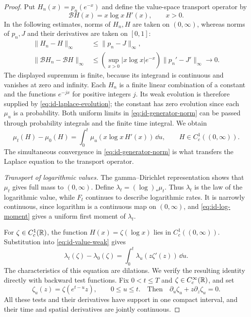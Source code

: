 \begin{proof}
Put $H_n(x)=p_n(e^{-x})$ and define the value-space transport operator by
\[
 \mathscr{B}H(x)=x\log x\,H'(x),\qquad x>0.
\]
In the following estimates, norms of $H_n,H$ are taken on $(0,\infty)$, whereas norms of $p_n,J$ and their derivatives are taken on $[0,1]$:
\begin{equation}
 \begin{aligned}
 \|H_n-H\|_\infty&\le\|p_n-J\|_\infty,\\
 \|\mathscr{B}H_n-\mathscr{B}H\|_\infty
 &\le\left(\sup_{x>0}|x\log x|e^{-x}\right)
                   \|p_n'-J'\|_\infty\longrightarrow0.
 \end{aligned}
 \label{eq:id-generator-norm}
\end{equation}
The displayed supremum is finite, because its integrand is continuous and vanishes at zero and infinity.
Each $H_n$ is a finite linear combination of a constant and the functions $e^{-jx}$ for positive integers $j$.
Its weak evolution is therefore supplied by \eqref{eq:id-laplace-evolution}; the constant has zero evolution since each $\mu_u$ is a probability.
Both uniform limits in \eqref{eq:id-generator-norm} can be passed through probability integrals and the finite time integral.
We obtain
\begin{equation}
 \mu_t(H)-\mu_0(H)
 =\int_0^t\mu_u(x\log x\,H'(x))\,\dd u,
 \qquad H\in C_c^1((0,\infty)).
 \label{eq:id-value-weak}
\end{equation}
The simultaneous convergence in \eqref{eq:id-generator-norm} is what transfers the Laplace equation to the transport operator.

\medskip\noindent\emph{Transport of logarithmic values.}
The gamma--Dirichlet representation shows that $\mu_t$ gives full mass to $(0,\infty)$.
Define $\lambda_t=(\log)_*\mu_t$.
Thus $\lambda_t$ is the law of the logarithmic value, while $F_t$ continues to describe logarithmic rates.
It is narrowly continuous, since logarithm is a continuous map on $(0,\infty)$, and \eqref{eq:id-log-moment} gives a uniform first moment of $\lambda_t$.

For $\zeta\in C_c^1(\mathbb R)$, the function $H(x)=\zeta(\log x)$ lies in $C_c^1((0,\infty))$.
Substitution into \eqref{eq:id-value-weak} gives
\begin{equation}
 \lambda_t(\zeta)-\lambda_0(\zeta)
 =\int_0^t\lambda_u(z\zeta'(z))\,\dd u.
 \label{eq:id-log-transport}
\end{equation}
The characteristics of this equation are dilations.
We verify the resulting identity directly with backward test functions.
Fix $0<t\le T$ and $\zeta\in C_c^\infty(\mathbb R)$, and set
\begin{equation}
 \zeta_u(z)=\zeta(e^{t-u}z),\qquad 0\le u\le t.
 \quad\text{Then}\quad
 \partial_u\zeta_u+z\partial_z\zeta_u=0.
 \label{eq:id-backward-test}
\end{equation}
All these tests and their derivatives have support in one compact interval, and their time and spatial derivatives are jointly continuous.


\end{proof}
